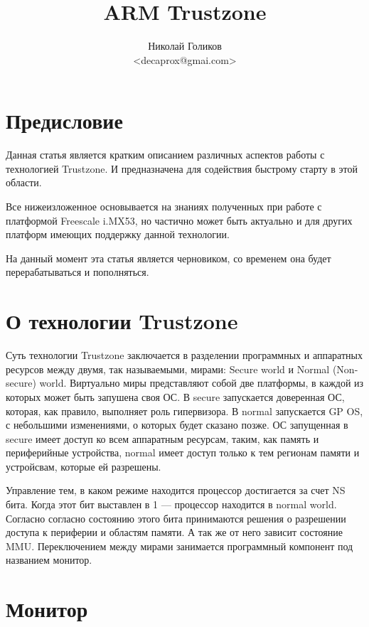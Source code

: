 \documentclass[11pt]{article}
\title{\textbf{ARM Trustzone}}
\author{Николай Голиков\\
		<decaprox@gmai.com>}
\date{}
\begin{document}
\maketitle

\section{Предисловие}
Данная статья является кратким описанием различных аспектов работы с технологией
 Trustzone. И предназначена для содействия быстрому старту в этой области.

Все нижеизложенное основывается на знаниях полученных при работе с платформой
Freescale i.MX53, но частично может быть актуально и для других платформ имеющих
поддержку данной технологии.

На данный момент эта статья является черновиком, со временем она будет 
перерабатываться и пополняться.


\section{О технологии Trustzone}
Суть технологии Trustzone заключается в разделении программных и аппаратных ресурсов между двумя, так называемыми, мирами: Secure world и Normal (Non-secure) world. 
Виртуально миры представляют собой две платформы, в каждой из которых может быть
запушена своя ОС. В secure запускается доверенная ОС, которая, как правило,
выполняет роль гипервизора. В normal запускается GP OS, с небольшими изменениями, о
которых будет сказано позже. ОС запущенная в secure имеет доступ ко всем аппаратным 
ресурсам, таким, как память и периферийные устройства, normal имеет доступ только к
тем регионам памяти и устройсвам, которые ей разрешены.

Управление тем, в каком режиме находится процессор достигается за счет NS бита.
Когда этот бит выставлен в 1 --- процессор находится в normal world. Согласно 
согласно состоянию этого бита принимаются решения о разрешении доступа к периферии
и областям памяти. А так же от него зависит состояние MMU. Переключением между мирами
занимается программный компонент под названием монитор.


\section{Монитор}
\end{document}
